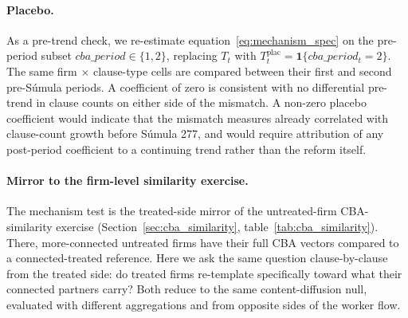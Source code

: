 \paragraph{Placebo.} As a pre-trend check, we re-estimate
equation~\eqref{eq:mechanism_spec} on the pre-period subset
$cba\_period \in \{1, 2\}$, replacing $T_t$ with
$T^{\text{plac}}_t = \mathbf{1}\{cba\_period_{t} = 2\}$. The same firm
$\times$ clause-type cells are compared between their first and second
pre-Súmula periods. A coefficient of zero is consistent with no
differential pre-trend in clause counts on either side of the mismatch.
A non-zero placebo coefficient would indicate that the mismatch measures
already correlated with clause-count growth before Súmula 277, and would
require attribution of any post-period coefficient to a continuing trend
rather than the reform itself.

\paragraph{Mirror to the firm-level similarity exercise.} The mechanism
test is the treated-side mirror of the untreated-firm CBA-similarity
exercise (Section~\ref{sec:cba_similarity}, table~\ref{tab:cba_similarity}).
There, more-connected untreated firms have their full CBA vectors compared
to a connected-treated reference. Here we ask the same question
clause-by-clause from the treated side: do treated firms re-template
specifically toward what their connected partners carry? Both reduce to
the same content-diffusion null, evaluated with different aggregations
and from opposite sides of the worker flow.
